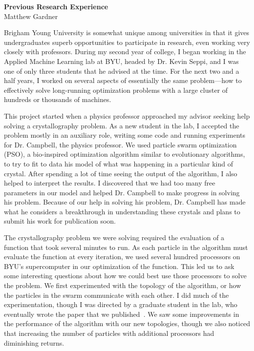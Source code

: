 \documentclass[onecolumn, 12pt]{article}
\begin{document}
\pagestyle{empty}

\begin{center}
  \textbf{Previous Research Experience}\\
  Matthew Gardner
\end{center}
\vspace{-4mm}

Brigham Young University is somewhat unique among universities in that it gives
undergraduates superb opportunities to participate in research, even working
very closely with professors.  During my second year of college, I began
working in the Applied Machine Learning lab at BYU, headed by Dr. Kevin Seppi,
and I was one of only three students that he advised at the time.  For the next
two and a half years, I worked on several aspects of essentially the same
problem---how to effectively solve long-running optimization problems with a
large cluster of hundreds or thousands of machines.

This project started when a physics professor approached my advisor seeking
help solving a crystallography problem.  As a new student in the lab, I
accepted the problem mostly in an auxiliary role, writing some code and running
experiments for Dr. Campbell, the physics professor.  We used particle swarm
optimization (PSO), a bio-inspired optimization algorithm similar to
evolutionary algorithms, to try to fit to data his model of what was happening
in a particular kind of crystal.  After spending a lot of time seeing the
output of the algorithm, I also helped to interpret the results.  I discovered
that we had too many free parameters in our model and helped Dr.  Campbell to
make progress in solving his problem.  Because of our help in solving his
problem, Dr. Campbell has made what he considers a breakthrough in
understanding these crystals and plans to submit his work for publication soon.

The crystallography problem we were solving required the evaluation of a
function that took several minutes to run.  As each particle in the algorithm
must evaluate the function at every iteration, we used several hundred
processors on BYU's supercomputer in our optimization of the function.  This
led us to ask some interesting questions about how we could best use those
processors to solve the problem.  We first experimented with the topology of
the algorithm, or how the particles in the swarm communicate with each other.
I did much of the experimentation, though I was directed by a graduate student
in the lab, who eventually wrote the paper that we
published~\cite{mcnabb-2009-large-particle-swarms}.  We saw some improvements
in the performance of the algorithm with our new topologies, though we also
noticed that increasing the number of particles with additional processors had
diminishing returns.
\end{document}
